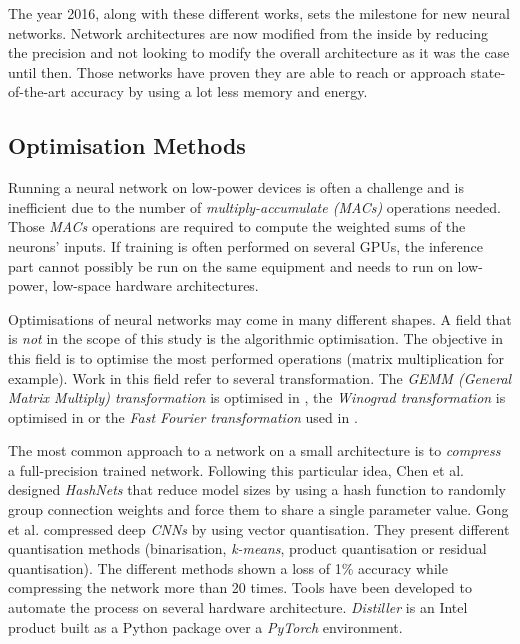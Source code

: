 The year 2016, along with these different works, sets the milestone for new neural networks. Network architectures are now modified from the inside by reducing the precision and not looking to modify the overall architecture as it was the case until then. Those networks have proven they are able to reach or approach state-of-the-art accuracy by using a lot less memory and energy.


\subsection{Optimisation Methods}

Running a neural network on low-power devices is often a challenge and is inefficient due to the number of \emph{multiply-accumulate (MACs)} operations needed. Those \emph{MACs} operations are required to compute the weighted sums of the neurons' inputs. If training is often performed on several GPUs, the inference part cannot possibly be run on the same equipment and needs to run on low-power, low-space hardware architectures.

Optimisations of neural networks may come in many different shapes. A field that is \emph{not} in the scope of this study is the algorithmic optimisation. The objective in this field is to optimise the most performed operations (matrix multiplication for example). Work in this field refer to several transformation. The \emph{GEMM (General Matrix Multiply) transformation} is optimised in \cite{Cong2014, Chellapilla2006}, the \emph{Winograd transformation} is optimised in \cite{Aydonat2017} or the \emph{Fast Fourier transformation} used in \cite{Ko2017}.

The most common approach to  a network on a small architecture is to \emph{compress} a full-precision trained network. Following this particular idea, Chen et al. \cite{Chen2015} designed \emph{HashNets} that reduce model sizes by using a hash function to randomly group connection weights and force them to share a single parameter value.  Gong et al. \cite{Gong2014} compressed deep \emph{CNNs} by using vector quantisation. They present different quantisation methods (binarisation, \emph{k-means}, product quantisation or residual quantisation). The different methods shown a loss of 1\% accuracy while compressing the network more than 20 times. Tools have been developed to automate the process on several hardware architecture. \emph{Distiller} \cite{Nzmora2019} is an Intel product built as a Python package over a \emph{PyTorch} environment.

